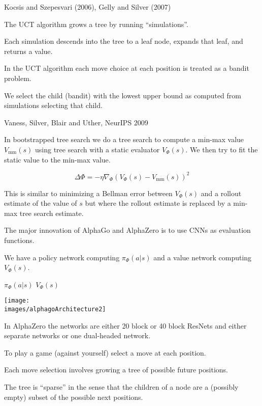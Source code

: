 {
{Kocsis and Szepesvari (2006), Gelly and Silver (2007)}

The UCT algorithm grows a tree by running ``simulations''.

\vfill
Each simulation descends into the tree to a leaf node, expands that leaf, and returns a value.

\vfill
In the UCT algorithm each move choice at each position is treated as a bandit problem.

\vfill
We select the child (bandit) with the lowest upper bound as computed from simulations selecting that child.


{Vaness, Silver, Blair and Uther, NeurIPS 2009}

In bootstrapped tree search we do a tree search to compute a min-max value $V_{\mathrm{mm}}(s)$
using tree search with a static evaluator $V_\Phi(s)$.  We then try to fit the static value to the min-max value.

\vfill
$$\Delta \Phi = - \eta \nabla_\Phi \left(V_\Phi(s) - V_{\mathrm{mm}}(s)\right)^2$$

\vfill
This is similar to minimizing a Bellman error between $V_\Phi(s)$ and a rollout estimate of the value of $s$ but where the rollout
estimate is replaced by a min-max tree search estimate.



The major innovation of AlphaGo and AlphaZero is to use CNNs as evaluation functions.

\vfill
We have a policy network computing $\pi_\Phi(a|s)$ and a value network computing $V_\Phi(s)$.


\centerline{$\pi_\Phi(a|s)$ \hspace{.5in} $V_\Phi(s)$}
\centerline{\texttt{[image: \\images/alphagoArchitecture2]}}

\vfill
In AlphaZero the networks are either 20 block or 40 block ResNets and either separate networks or one dual-headed network.


To play a game (against yourself) select a move at each position.

\vfill
Each move selection involves growing a tree of possible future positions.

\vfill
The tree is ``sparse'' in the sense that the children of a node are a (possibly empty) subset of the possible next positions.

}
